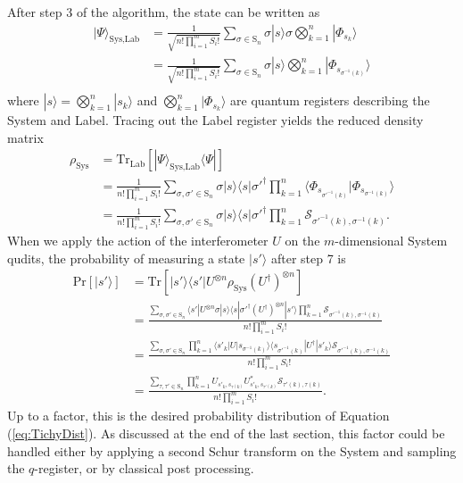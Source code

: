After step 3 of the algorithm, the state can be written as
\begin{align}
|\Psi\rangle_{\textrm{Sys,Lab}}
 &= \frac{1}{\sqrt{n!\prod_{i=1}^m S_i!}}\sum_{\sigma\in\textrm{S}_n}\sigma|s\rangle\sigma\bigotimes_{k=1}^n|\Phi_{s_k}\rangle\\
 &= \frac{1}{\sqrt{n!\prod_{i=1}^m S_i!}}\sum_{\sigma\in\textrm{S}_n}\sigma|s\rangle\bigotimes_{k=1}^n|\Phi_{s_{\sigma^{-1}(k)}}\rangle\\
\end{align}
where $|s\rangle=\bigotimes_{k=1}^n|s_k\rangle$ and $\bigotimes_{k=1}^n|\Phi_{s_k}\rangle$ are quantum registers describing the System and Label. 
Tracing out the Label register yields the reduced density matrix
\begin{align}
\rho_{\textrm{Sys}}
 &= \textrm{Tr}_{\textrm{Lab}}[|\Psi\rangle_{\textrm{Sys,Lab}}\langle\Psi|]\\
 &= \frac{1}{n!\prod_{i=1}^m S_i!}\sum_{\sigma,\sigma'\in\textrm{S}_n}\sigma|s\rangle\langle s|\sigma'^\dagger \prod_{k=1}^n \langle\Phi_{s_{\sigma'^{-1}(k)}}|\Phi_{s_{\sigma^{-1}(k)}}\rangle\\
 &=\frac{1}{n!\prod_{i=1}^m S_i!}\sum_{\sigma,\sigma'\in\textrm{S}_n}\sigma|s\rangle\langle s|\sigma'^\dagger \prod_{k=1}^n \mathcal{S}_{\sigma'^{-1}(k),\sigma^{-1}(k)}.
\end{align}
When we apply the action of the interferometer $U$ on the $m$-dimensional System qudits, the probability of measuring a state $|s'\rangle$ after step 7 is
\begin{align}
\textrm{Pr}[|s'\rangle] 
 &= \textrm{Tr}[|s'\rangle\langle s'|U^{\otimes n}\rho_{\textrm{Sys}}(U^\dagger)^{\otimes n}]\\
 &= \frac{\sum_{\sigma, \sigma' \in \textrm{S}_n}\langle s'|U^{\otimes n}\sigma|s\rangle\langle s|\sigma'^\dagger(U^\dagger)^{\otimes n}|s'\rangle \prod_{k=1}^n\mathcal{S}_{\sigma'^{-1}(k),\sigma^{-1}(k)}}{n!\prod_{i=1}^m S_i!}\\
 &= \frac{\sum_{\sigma, \sigma' \in \textrm{S}_n} \prod_{k=1}^n \langle s'_k|U|s_{\sigma^{-1}(k)}\rangle\langle s_{\sigma'^{-1}(k)}|U^\dagger|s'_k\rangle\mathcal{S}_{\sigma'^{-1}(k),\sigma^{-1}(k)}}{n!\prod_{i=1}^m S_i!}\\
 &= \frac{\sum_{\tau, \tau' \in \textrm{S}_n} \prod_{k=1}^n U_{s'_k,s_{\tau(k)}} U^*_{s'_k,s_{\tau'(k)}} \mathcal{S}_{\tau'(k),\tau(k)}}{n!\prod_{i=1}^m S_i!}.
\end{align}
Up to a factor, this is the desired probability distribution of Equation (\ref{eq:TichyDist}).
As discussed at the end of the last section, this factor could be handled either by applying a second Schur transform on the System and sampling the $q$-register, or by classical post processing.


